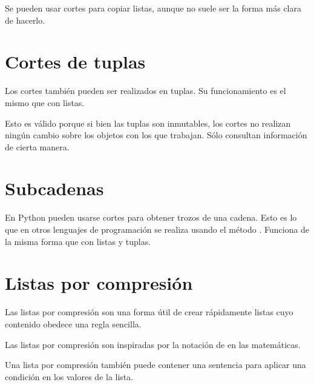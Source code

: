 Se pueden usar cortes para copiar listas, aunque no suele ser la forma más clara de hacerlo.


\section{Cortes de tuplas}

Los cortes también pueden ser realizados en tuplas. Su funcionamiento es el mismo que con listas.


Esto es válido porque si bien las tuplas son inmutables, los cortes no realizan ningún cambio sobre los objetos con los que trabajan. Sólo consultan información de cierta manera.

\section{Subcadenas}

En Python pueden usarse cortes para obtener trozos de una cadena. Esto es lo que en otros lenguajes de programación se realiza usando el método . Funciona de la misma forma que con listas y tuplas.



\section{Listas por compresión}

Las listas por compresión son una forma útil de crear rápidamente listas cuyo contenido obedece una regla sencilla.


Las listas por compresión son inspiradas por la notación de  en las matemáticas.\smallskip

Una lista por compresión también puede contener una sentencia  para aplicar una condición en los valores de la lista.


